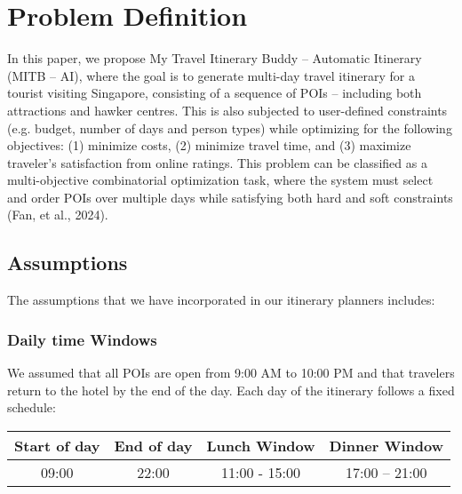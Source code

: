 \documentclass{ecai}
\begin{document}
\section{Problem Definition}
In this paper, we propose My Travel Itinerary Buddy – Automatic Itinerary (MITB – AI), where the goal is to generate multi-day travel itinerary for a tourist visiting Singapore, consisting of a sequence of POIs – including both attractions and hawker centres. This is also subjected to user-defined constraints (e.g. budget, number of days and person types) while optimizing for the following objectives: (1) minimize costs, (2) minimize travel time, and (3) maximize traveler’s satisfaction from online ratings. This problem can be classified as a multi-objective combinatorial optimization task, where the system must select and order POIs over multiple days while satisfying both hard and soft constraints (Fan, et al., 2024).

\subsection{Assumptions}
The assumptions that we have incorporated in our itinerary planners includes: 
\subsubsection{Daily time Windows}
We assumed that all POIs are open from 9:00 AM to 10:00 PM and that travelers return to the hotel by the end of the day. Each day of the itinerary follows a fixed schedule:
\begin{table}[h]
    \centering
    \begin{tabular}{|c|c|c|c|}
         \hline
         \textbf{Start of day} & \textbf{End of day} & \textbf{Lunch Window} & \textbf{Dinner Window} \\
         \hline
         09:00 & 22:00 & 11:00 - 15:00 & 17:00 – 21:00 \\
         \hline
    \end{tabular}
\end{table}
\end{document}
